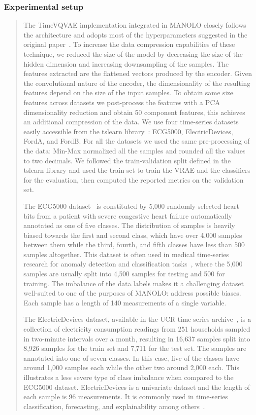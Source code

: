 \subsubsection*{Experimental setup}
\begin{quote}
The TimeVQVAE implementation integrated in MANOLO closely follows the architecture and adopts most of the hyperparameters suggested in the original paper~\cite{2023_AISTATS_vqvae}. To increase the data compression capabilities of these technique, we reduced the size of the model by decreasing the size of the hidden dimension and increasing downsampling of the samples. The features extracted are the flattened vectors produced by the encoder. Given the convolutional nature of the encoder, the dimensionality of the resulting features depend on the size of the input samples. To obtain same size features across datasets we post-process the features with a PCA dimensionality reduction and obtain 50 component features, this achieves an additional compression of the data. We use four time-series datasets easily accessible from the tslearn library~\cite{JMLR:v21:20-091}: ECG5000, ElectricDevices, FordA, and FordB. For all the datasets we used the same pre-processing of the data: Min-Max normalized all the samples and rounded all the values to two decimals. We followed the train-validation split defined in the tslearn library and used the train set to train the VRAE and the classifiers for the evaluation, then computed the reported metrics on the validation set.

The ECG5000 dataset~\cite{2000_physiobank_ECG5000} is constituted by 5,000 randomly selected heart bits from a patient with severe congestive heart failure automatically annotated as one of five classes. The distribution of samples is heavily biased towards the first and second class, which have over 4,000 samples between them while the third, fourth, and fifth classes have less than 500 samples altogether. This dataset is often used in medical time-series research for anomaly detection and classification tasks~\cite{2015_ACM_ecg5000InitialPaper, 2022_IEEE_tsmae, 2022_IEEE_lightweight}, where the 5,000 samples are usually split into 4,500 samples for testing and 500 for training. The imbalance of the data labels makes it a challenging dataset well-suited to one of the purposes of MANOLO: address possible biases. Each sample has a length of 140 measurements of a single variable. 

The ElectricDevices dataset, available in the UCR time-series archive~\cite{2019_IEEE_ucr}, is a collection of electricity consumption readings from 251 households sampled in two-minute intervals over a month, resulting in 16,637 samples split into 8,926 samples for the train set and 7,711 for the test set. The samples are annotated into one of seven classes. In this case, five of the classes have around 1,000 samples each while the other two around 2,000 each. This illustrates a less severe type of class imbalance when compared to the ECG5000 dataset. ElectricDevices is a univariate dataset and the length of each sample is 96 measurements. It is commonly used in time-series classification, forecasting, and explainability among others~\cite{2023_Springer_TSandXAI, 2024_IEEE_gmtpm, 2020_IEEE_fastee, 2016_SEKE_time}.


\end{quote}
